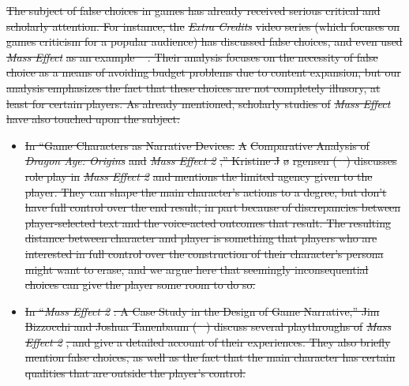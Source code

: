 \documentclass[arts,article,submit,moreauthors,pdftex,10pt,a4paper]{Definitions/mdpi}
\providecommand{\DIFdel}[1]{{\protect\color{red}\sout{#1}}}                      %
\providecommand{\DIFdelbegin}{} %
\begin{document}
\DIFdelbegin %

\DIFdel{The subject of false choices in games has already received serious critical and scholarly attention.
For instance, the }\emph{\DIFdel{Extra Credits}} %
\DIFdel{video series (which focuses on games criticism for a popular audience) has discussed false choices, and even used }\emph{\DIFdel{Mass Effect}} %
\DIFdel{as an example \mbox{%
\citep{floyd2013illusion}}\hspace{0pt}%
.
Their analysis focuses on the necessity of false choice as a means of avoiding budget problems due to content expansion, but our analysis emphasizes the fact that these choices are not completely illusory, at least for certain players.
As already mentioned, scholarly studies of }\emph{\DIFdel{Mass Effect}} %
\DIFdel{have also touched upon the subject:
}%
\begin{itemize}%
\item%
\DIFdel{In ``Game Characters as Narrative Devices. }%
\DIFdel{A}%
\DIFdel{Comparative Analysis of }\emph{\DIFdel{Dragon Age: Origins}} %
\DIFdel{and }\emph{\DIFdel{Mass Effect 2}}%
\DIFdel{,'' Kristine J}%
\DIFdel{\o}%
\DIFdel{rgensen (\mbox{%
\citeyear{jorgensen2010game}}\hspace{0pt}%
) discusses role play in }\emph{\DIFdel{Mass Effect 2}} %
\DIFdel{and mentions the limited agency given to the player. They can shape the main character's actions to a degree, but don't have full control over the end result, in part because of discrepancies between player-selected text and the voice-acted outcomes that result. The resulting distance between character and player is something that players who are interested in full control over the construction of their character's persona might want to erase, and we argue here that seemingly inconsequential choices can give the player some room to do so.
  }%
\item%
\DIFdel{In ``}\emph{\DIFdel{Mass Effect 2}}%
\DIFdel{: A Case Study in the Design of Game Narrative,'' Jim Bizzocchi and Joshua Tanenbaum (\mbox{%
\citeyear{bizzocchi2012mass}}\hspace{0pt}%
) discuss several playthroughs of }\emph{\DIFdel{Mass Effect 2}}%
\DIFdel{, and give a detailed account of their experiences. They also briefly mention false choices, as well as the fact that the main character has certain qualities that are outside the player's control.
}
\end{itemize}%
\end{document}
